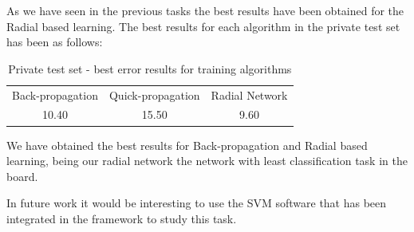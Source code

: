 \documentclass[a4paper,10pt,titlepage]{article}
\begin{document}
\par As we have seen in the previous tasks the best results have been obtained for the Radial based learning. The best results for each algorithm in the private test set has been as follows: 

\begin{table}[H] 
\caption{Private test set - best error results for training algorithms} %
\centering 
\begin{tabular}{c c c} 
\hline\hline 
Back-propagation & Quick-propagation & Radial Network \\
10.40 & 15.50 &  9.60 \\

\hline 
\end{tabular} 
\label{tab:dist_result} 
\end{table}

\par We have obtained the best results for Back-propagation and Radial based learning, being our radial network the network with least classification task in the board.

\par In future work it would be interesting to use the SVM software that has been integrated in the framework to study this task.  
\end{document}
